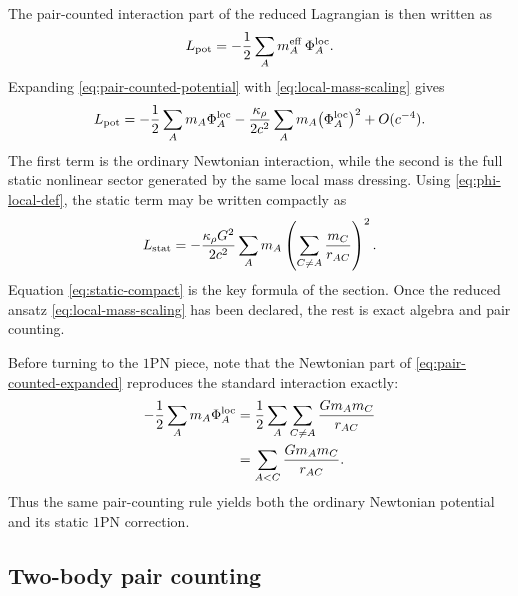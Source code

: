 \documentclass[11pt]{article}
\newcommand{\krho}{\kappa_{\rho}}
\begin{document}
The pair-counted interaction part of the reduced Lagrangian is then written as
\begin{equation}
L_{\rm pot}
=
-\frac12\sum_A m_A^{\rm eff}\,\Phi_A^{\rm loc}.
\label{eq:pair-counted-potential}
\end{equation}
Expanding \eqref{eq:pair-counted-potential} with
\eqref{eq:local-mass-scaling} gives
\begin{equation}
L_{\rm pot}
=
-\frac12\sum_A m_A \Phi_A^{\rm loc}
-\frac{\krho}{2c^2}\sum_A m_A\bigl(\Phi_A^{\rm loc}\bigr)^2
+ O(c^{-4}).
\label{eq:pair-counted-expanded}
\end{equation}
The first term is the ordinary Newtonian interaction, while the second is the full static
nonlinear sector generated by the same local mass dressing. Using
\eqref{eq:phi-local-def}, the static term may be written compactly as
\begin{equation}
L_{\rm stat}
=
-\frac{\krho G^2}{2c^2}
\sum_A
m_A
\left(
\sum_{C\neq A}\frac{m_C}{r_{AC}}
\right)^2.
\label{eq:static-compact}
\end{equation}
Equation \eqref{eq:static-compact} is the key formula of the section. Once the reduced
ansatz \eqref{eq:local-mass-scaling} has been declared, the rest is exact algebra and
pair counting.

Before turning to the \(1\)PN piece, note that the Newtonian part of
\eqref{eq:pair-counted-expanded} reproduces the standard interaction exactly:
\begin{align}
-\frac12\sum_A m_A \Phi_A^{\rm loc}
&=
\frac12\sum_A\sum_{C\neq A}\frac{Gm_A m_C}{r_{AC}}
\nonumber\\
&=
\sum_{A<C}\frac{Gm_A m_C}{r_{AC}}.
\label{eq:newtonian-pair-counting}
\end{align}
Thus the same pair-counting rule yields both the ordinary Newtonian potential and its
static \(1\)PN correction.

\subsection{Two-body pair counting}
\label{sec:pair-counting}
\end{document}
